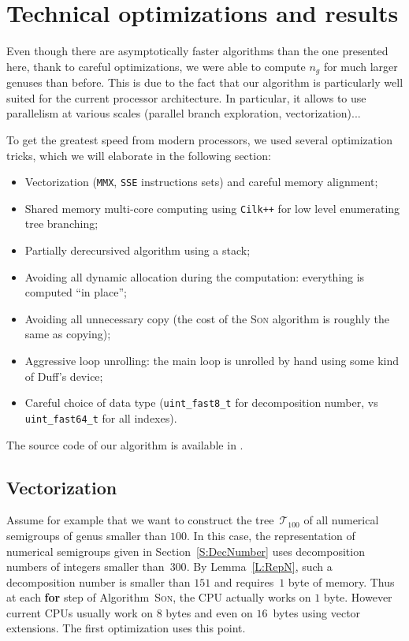 \documentclass[reqno]{amsart}
\theoremstyle{plain}
\theoremstyle{definition}
\newcommand{\CilkP}{\texttt{Cilk++}\xspace}
\newcommand{\MMX}{\texttt{MMX}\xspace}
\newcommand{\SSE}{\texttt{SSE}\xspace}
\begin{document}
\section{Technical optimizations and results}

\label{S:Opti}

Even though there are asymptotically faster algorithms than the one presented here,
thank to careful optimizations, we were able to compute $n_g$ for much larger
genuses than before. This is due to the fact that our algorithm is particularly
well suited for the current processor architecture. In particular, it allows
to use parallelism at various scales (parallel branch exploration,
vectorization)...

To get the greatest speed from modern processors, we used several optimization
tricks, which we will elaborate in the following section:


\begin{itemize}

\item Vectorization (\MMX, \SSE instructions sets) and careful memory alignment; 
\item Shared memory multi-core computing using \CilkP for low level
  enumerating tree branching;
\item Partially derecursived algorithm using a stack;
\item Avoiding all dynamic allocation during the computation: everything is
  computed ``in place'';
\item Avoiding all unnecessary copy (the cost of the \textsc{Son} algorithm is
  roughly the same as copying);
\item Aggressive loop unrolling: the main loop is unrolled by hand using some
  kind of Duff's device;
\item Careful choice of data type (\verb|uint_fast8_t| for decomposition
  number, vs \verb|uint_fast64_t| for all indexes).
\end{itemize}

The source code of our algorithm is available in \cite{code}.
\subsection{Vectorization}

Assume for example that we want to construct the tree~$\mathcal{T}_{100}$
of all numerical semigroups of genus smaller than $100$.  In this case, the
representation of numerical semigroups given in Section~\ref{S:DecNumber} uses
decomposition numbers of integers smaller than~$300$.  By Lemma~\ref{L:RepN},
such a decomposition number is smaller than $151$ and requires~$1$ byte of
memory.  Thus at each \textbf{for} step of Algorithm~\textsc{Son}, the CPU
actually works on $1$ byte. However current CPUs usually work on $8$ bytes and
even on $16$~bytes using vector extensions. 
The first optimization uses this point. 
\end{document}
